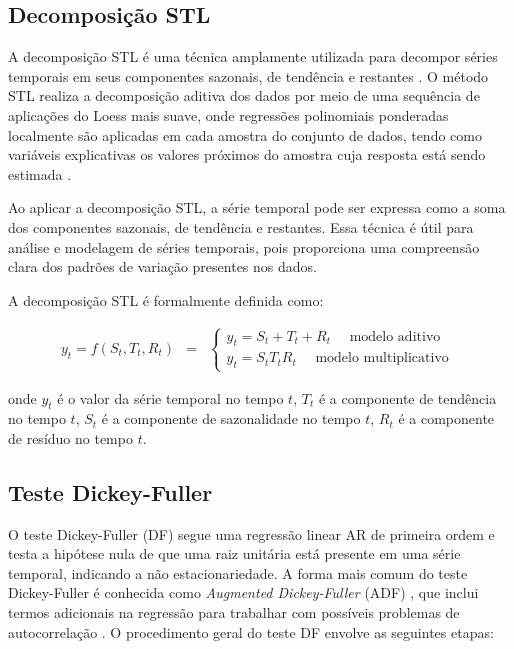 \subsection{Decomposi\c c\~ao STL}
 
A decomposição STL é uma técnica amplamente utilizada para decompor séries temporais em seus componentes sazonais, de tendência e restantes \cite{RIBEIRO2023112982}. O método STL realiza a decomposição aditiva dos dados por meio de uma sequência de aplicações do Loess mais suave, onde regressões polinomiais ponderadas localmente são aplicadas em cada amostra do conjunto de dados, tendo como variáveis explicativas os valores próximos do amostra cuja resposta está sendo estimada \cite{Theodosiou20111178}.
 
Ao aplicar a decomposição STL, a série temporal pode ser expressa como a soma dos componentes sazonais, de tendência e restantes. Essa técnica é útil para análise e modelagem de séries temporais, pois proporciona uma compreensão clara dos padrões de variação presentes nos dados.
 
A decomposição STL é formalmente definida como:
 
 \begin{eqnarray}
 	y_t=f\left(S_t, T_t, R_t\right)&=&\left\{\begin{array}{l}
 		y_t=S_t+T_t+R_t \quad \text { modelo aditivo } \\
 		y_t=S_t T_t R_t \quad \text { modelo multiplicativo }
 	\end{array}\right. \label{eq:stl}
 \end{eqnarray}

\noindent onde $y_t$ é o valor da série temporal no tempo $t$, $T_t$ é a componente de tendência no tempo $t$, $S_t$ é a componente de sazonalidade no tempo $t$, $R_t$ é a componente de resíduo no tempo $t$.



\subsection{Teste Dickey-Fuller}

O teste Dickey-Fuller (DF) segue uma regressão linear AR de primeira ordem e testa a hipótese nula de que uma raiz unitária está presente em uma série temporal, indicando a não estacionariedade. A forma mais comum do teste Dickey-Fuller é conhecida como \textit{Augmented Dickey-Fuller} (ADF) , que inclui termos adicionais na regressão para trabalhar com possíveis problemas de autocorrelação
 \cite{Agiakloglou}. O procedimento geral do teste DF envolve as seguintes etapas:

